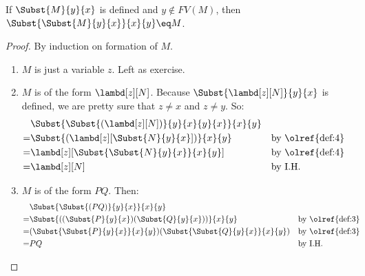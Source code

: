 \documentclass[../../../include/open-logic-section]{subfiles}
\begin{document}
\begin{thm}
  If $\Subst{M}{y}{x}$ is defined and $y \notin FV(M)$, then $\Subst{\Subst{M}{y}{x}}{x}{y} \eq M$.
\end{thm}
\begin{proof}
  By induction on formation of $M$.
  \begin{enumerate}
  \item[\rule{VAR}] $M$ is just a variable $z$. Left as exercise.
  \item[\rule{ABS}] $M$ is of the form $\lambd[z][N]$. Because
    $\Subst{\lambd[z][N]}{y}{x}$ is defined, we are pretty sure
    that $z \neq x$ and $z \neq y$. So:
    \begin{align*}
      &\Subst{\Subst{(\lambd[z][N])}{y}{x}{y}{x}}{x}{y}\\
      =&\Subst{(\lambd[z][\Subst{N}{y}{x}])}{x}{y}
       && \text{by \olref{def:4}} \\
      =&\lambd[z][\Subst{\Subst{N}{y}{x}}{x}{y}]
       && \text{by \olref{def:4}} \\
      =&\lambd[z][N] && \text{by I.H.} 
    \end{align*}
  \item[\rule{APP}] $M$ is of the form $PQ$. Then:
    \begin{align*}
      &\Subst{\Subst{(PQ)}{y}{x}}{x}{y} \\
      =&\Subst{((\Subst{P}{y}{x})(\Subst{Q}{y}{x}))}{x}{y}
         && \text{by \olref{def:3}} \\
      =&(\Subst{\Subst{P}{y}{x}}{x}{y})(\Subst{\Subst{Q}{y}{x}}{x}{y})
         && \text{by \olref{def:3}} \\
      =&PQ &&\text{by I.H.}
    \end{align*}
  \end{enumerate}
\end{proof}
\end{document}
